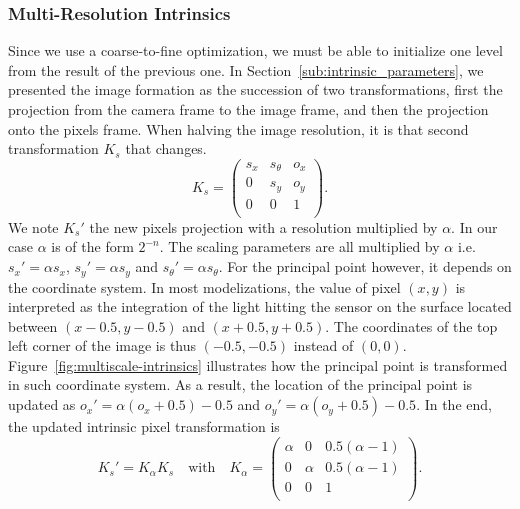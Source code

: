 \subsubsection{Multi-Resolution Intrinsics}%
\label{ssub:multires-intrinsics}

Since we use a coarse-to-fine optimization,
we must be able to initialize one level from the result of the previous one.
In Section~\ref{sub:intrinsic_parameters}, we presented the image formation as
the succession of two transformations, first the projection from the camera frame
to the image frame, and then the projection onto the pixels frame.
When halving the image resolution, it is that second transformation $K_s$ that changes.
\[
	K_s = \begin{pmatrix}
		s_x & s_{\theta} & o_x \\
		0 & s_y & o_y \\
		0 & 0 & 1 \\
	\end{pmatrix}.
\]
We note $K_s'$ the new pixels projection with a resolution multiplied by $\alpha$.
In our case $\alpha$ is of the form $2^{-n}$.
The scaling parameters are all multiplied by $\alpha$ i.e.\
$s_x' = \alpha s_x$,
$s_y' = \alpha s_y$ and
$s_{\theta}' = \alpha s_{\theta}$.
For the principal point however, it depends on the coordinate system.
In most modelizations, the value of pixel $(x,y)$ is interpreted as the integration
of the light hitting the sensor on the surface located between $(x-0.5, y-0.5)$
and $(x+0.5, y+0.5)$.
The coordinates of the top left corner of the image is thus $(-0.5, -0.5)$
instead of $(0,0)$.
Figure~\ref{fig:multiscale-intrinsics} illustrates how
the principal point is transformed in such coordinate system.
As a result, the location of the principal point is updated as
$o_x' = \alpha(o_x + 0.5) - 0.5$ and
$o_y' = \alpha(o_y + 0.5) - 0.5$.
In the end, the updated intrinsic pixel transformation is
\[
	K_s' = K_{\alpha}K_s \quad \text{with} \quad
	K_{\alpha} = \begin{pmatrix}
		\alpha & 0 & 0.5(\alpha - 1) \\
		0 & \alpha & 0.5(\alpha - 1) \\
		0 & 0 & 1 \\
	\end{pmatrix}.
\]

